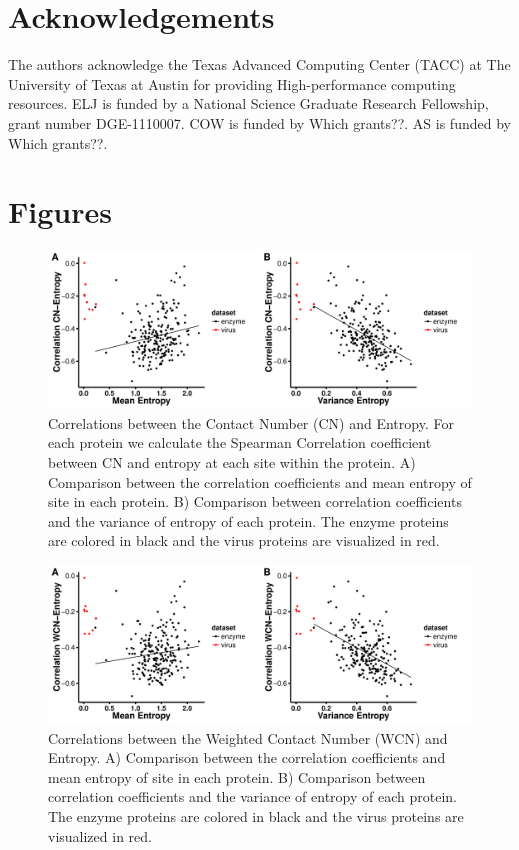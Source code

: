 \documentclass[12pt]{article}
\begin{document}
\section{Acknowledgements}
The authors acknowledge the Texas Advanced Computing Center (TACC) at The University of Texas at Austin for providing High-performance computing resources. ELJ is funded by a National Science Graduate Research Fellowship, grant number DGE-1110007. COW is funded by {\color{red} Which grants??}.  AS is funded by {\color{red} Which grants??}.


\cleardoublepage
\section*{Figures}

    \begin{figure}[H]
            \centerline{\includegraphics[width=7.5in]{entropy_cn_cor.pdf}}     
            \caption{Correlations between the Contact Number (CN) and Entropy. For each protein we calculate the Spearman Correlation coefficient between CN and entropy at each site within the protein. A) Comparison between the correlation coefficients and mean entropy of site in each protein. B) Comparison between correlation coefficients and the variance of entropy of each protein. The enzyme proteins are colored in black and the virus proteins are visualized in red. }
            \label{fig:entropy_cn_cor}
    \end{figure}

    \begin{figure}[H]
            \centerline{\includegraphics[width=7.5in]{entropy_wcn_cor.pdf}}     
            \caption{Correlations between the Weighted Contact Number (WCN) and Entropy. A) Comparison between the correlation coefficients and mean entropy of site in each protein. B) Comparison between correlation coefficients and the variance of entropy of each protein. The enzyme proteins are colored in black and the virus proteins are visualized in red.}
            \label{fig:entropy_wcn_cor}
    \end{figure}
\end{document}
